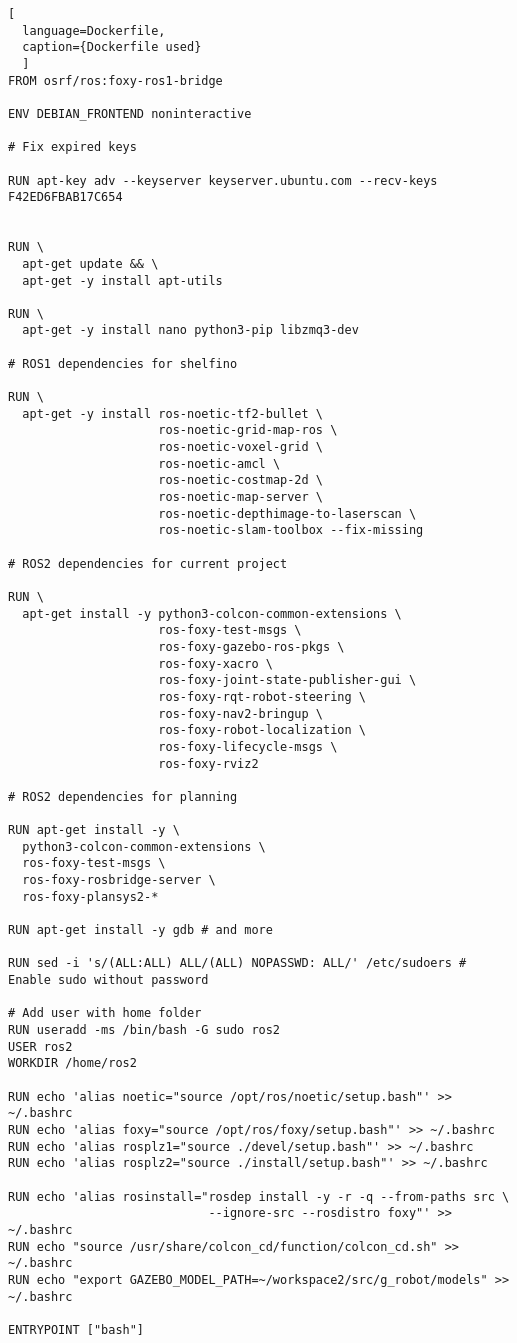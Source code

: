 \begin{lstlisting}[
  language=Dockerfile,
  caption={Dockerfile used}
  ]
FROM osrf/ros:foxy-ros1-bridge

ENV DEBIAN_FRONTEND noninteractive

# Fix expired keys

RUN apt-key adv --keyserver keyserver.ubuntu.com --recv-keys F42ED6FBAB17C654


RUN \
  apt-get update && \
  apt-get -y install apt-utils

RUN \
  apt-get -y install nano python3-pip libzmq3-dev

# ROS1 dependencies for shelfino
  
RUN \
  apt-get -y install ros-noetic-tf2-bullet \
                     ros-noetic-grid-map-ros \
                     ros-noetic-voxel-grid \
                     ros-noetic-amcl \
                     ros-noetic-costmap-2d \
                     ros-noetic-map-server \
                     ros-noetic-depthimage-to-laserscan \
                     ros-noetic-slam-toolbox --fix-missing

# ROS2 dependencies for current project

RUN \
  apt-get install -y python3-colcon-common-extensions \
                     ros-foxy-test-msgs \
                     ros-foxy-gazebo-ros-pkgs \
                     ros-foxy-xacro \
                     ros-foxy-joint-state-publisher-gui \
                     ros-foxy-rqt-robot-steering \
                     ros-foxy-nav2-bringup \
                     ros-foxy-robot-localization \
                     ros-foxy-lifecycle-msgs \
                     ros-foxy-rviz2

# ROS2 dependencies for planning

RUN apt-get install -y \
  python3-colcon-common-extensions \
  ros-foxy-test-msgs \
  ros-foxy-rosbridge-server \
  ros-foxy-plansys2-*

RUN apt-get install -y gdb # and more

RUN sed -i 's/(ALL:ALL) ALL/(ALL) NOPASSWD: ALL/' /etc/sudoers # Enable sudo without password

# Add user with home folder
RUN useradd -ms /bin/bash -G sudo ros2
USER ros2
WORKDIR /home/ros2

RUN echo 'alias noetic="source /opt/ros/noetic/setup.bash"' >> ~/.bashrc
RUN echo 'alias foxy="source /opt/ros/foxy/setup.bash"' >> ~/.bashrc
RUN echo 'alias rosplz1="source ./devel/setup.bash"' >> ~/.bashrc
RUN echo 'alias rosplz2="source ./install/setup.bash"' >> ~/.bashrc

RUN echo 'alias rosinstall="rosdep install -y -r -q --from-paths src \
                            --ignore-src --rosdistro foxy"' >> ~/.bashrc
RUN echo "source /usr/share/colcon_cd/function/colcon_cd.sh" >> ~/.bashrc
RUN echo "export GAZEBO_MODEL_PATH=~/workspace2/src/g_robot/models" >> ~/.bashrc

ENTRYPOINT ["bash"]
\end{lstlisting}


